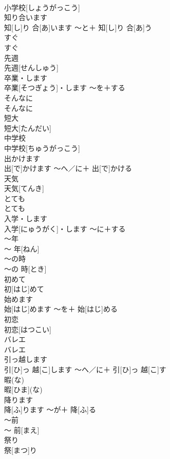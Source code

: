 \documentclass[8pt]{extreport}
\begin{document}
\begin{CJK}{UTF8}{min}
\\	小学校[しょうがっこう]		
\\	知り合います	
\\	知[し]り 合[あ]います	〜と＋ 知[し]り 合[あ]う	
\\	すぐ	
\\	すぐ		
\\	先週	
\\	先週[せんしゅう]		
\\	卒業・します	
\\	卒業[そつぎょう]・します	〜を＋する	
\\	そんなに	
\\	そんなに		
\\	短大	
\\	短大[たんだい]		
\\	中学校	
\\	中学校[ちゅうがっこう]		
\\	出かけます	
\\	出[で]かけます	〜へ／に＋ 出[で]かける	
\\	天気	
\\	天気[てんき]		
\\	とても	
\\	とても		
\\	入学・します	
\\	入学[にゅうがく]・します	〜に＋する	
\\	〜年	
\\	〜 年[ねん]		
\\	〜の時	
\\	〜の 時[とき]		
\\	初めて	
\\	初[はじ]めて		
\\	始めます	
\\	始[はじ]めます	〜を＋ 始[はじ]める	
\\	初恋	
\\	初恋[はつこい]		
\\	バレエ	
\\	バレエ		
\\	引っ越します	
\\	引[ひ]っ 越[こ]します	〜へ／に＋ 引[ひ]っ 越[こ]す	
\\	暇(な)	
\\	暇[ひま](な)		
\\	降ります	
\\	降[ふ]ります	〜が＋ 降[ふ]る	
\\	〜前	
\\	〜 前[まえ]		
\\	祭り	
\\	祭[まつ]り		

\end{CJK}
\end{document}
